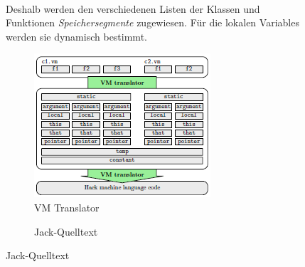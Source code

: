 \documentclass[12pt]{report}
\begin{document}
\begin{figure}[H]
\begin{minipage}[t]{0.45\textwidth}
    \paragraph{}
    Deshalb werden den verschiedenen Listen der Klassen und Funktionen \textit{Speichersegmente} zugewiesen.
    Für die lokalen Variables werden sie dynamisch bestimmt.
    \begin{figure}[H]
      \caption{VM Translator}
      \label{fig:vm_translator}
      \centering
      \includegraphics[width=\textwidth]{vm_translator}
    \end{figure}
  \end{minipage}
  \hfill
  \begin{minipage}[t]{0.45\textwidth}
    \begin{figure}[H]
      \caption{Jack-Quelltext}
      \label{fig:jack_quelltext}
      \centering

\end{figure}
\end{minipage}
\end{figure}
\end{document}
